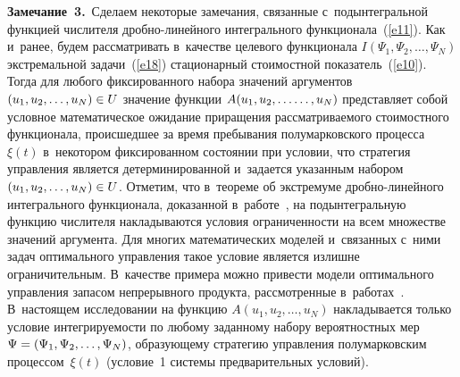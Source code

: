 \begin{multicols}{2}
\noindent
\textbf{Замечание~3.}\ Сделаем некоторые замечания, связан\-ные с~подынтегральной 
функцией числителя дроб\-но-ли\-ней\-но\-го интегрального функционала~(\ref{e11}). 
Как и~ранее, будем рассматривать в~качестве целевого функционала $I(\Psi_1, \Psi_2,\ldots,\Psi_N)$\linebreak 
экстремальной задачи~(\ref{e18}) стационарный стоимостной показатель~(\ref{e10}). 
Тогда для любого фиксированного набора значений аргументов $(u_1,u_2,\ldots,u_N)\hm\in U$ 
значение функции $A(u_1,u_2,\ldots\linebreak \ldots,u_N)$ представляет собой условное математическое
 ожидание приращения рассматриваемого стоимостного функционала, 
 происшедшее за время пребывания полумарковского процесса~$\xi(t)$ в~некотором 
 фиксированном  состоянии при условии, что стратегия управления является 
 детерминированной и~задается указанным набором $(u_1,u_2,\ldots,u_N)\hm\in U$. 
 Отметим, что в~теореме об экстремуме дроб\-но-ли\-ней\-но\-го интегрального 
 функционала, доказанной в~работе~\cite[гл.~10]{12}, 
 на подынтегральную функцию числителя накладываются условия ограниченности на 
 всем множестве значений аргумента. Для многих математических моделей и~связанных 
 с~ними задач оптимального управления такое условие является излишне ограничительным. 
 В~качестве примера можно привести модели оптимального управления запасом непрерывного 
 продукта, рассмотренные в~работах~\cite{27, 28}. 
 В~настоящем исследовании на функцию $A(u_1,u_2,\ldots,u_N)$ накладывается только 
 условие интегрируемости по любому заданному набору вероятностных мер 
 $\Psi\hm=(\Psi_1, \Psi_2,\ldots,\Psi_N)$, образующему стратегию управления 
 полумарковским процессом~$\xi(t)$ (условие~1 системы предварительных условий).

\smallskip


\end{multicols}
